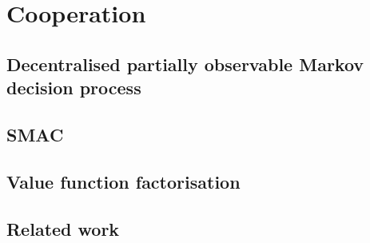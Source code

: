 \chapter{Cooperation}\label{ch:cooperation}
\section{Decentralised partially observable Markov decision process}
\section{SMAC}
\section{Value function factorisation}
\section{Related work}

